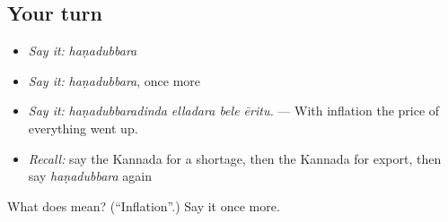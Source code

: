 \subsection*{Your turn}
\begin{itemize}
\raggedright
  \item \emph{Say it:} \emph{haṇadubbara}
  \item \emph{Say it:} \emph{haṇadubbara}, once more
  \item \emph{Say it:} \emph{haṇadubbaradinda elladara bele ēritu.} — With inflation the price of everything went up.
  \item \emph{Recall:} say the Kannada for a shortage, then the Kannada for export, then say \emph{haṇadubbara} again
\end{itemize}

\begin{tcolorbox}[breakable,colback=teal!4,colframe=teal!35!black,title={Before you move on}]
What does  mean? (\textquotedblleft{}Inflation\textquotedblright{}.) Say it once more.
\end{tcolorbox}
